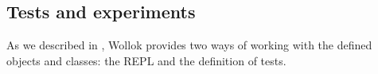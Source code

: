 %
%
%






\subsection{Tests and experiments}
\label{sec:testing}
As we described in , Wollok provides two ways of working with the defined objects and classes: the REPL and the definition of tests.


